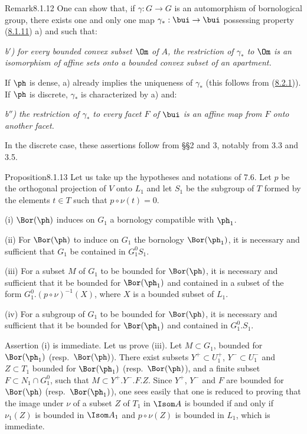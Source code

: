 \documentclass[12pt,a4paper,oneside,english]{smfart}
\makeatletter
\newcommand{\btanchor}[1]{\leavevmode\Hy@raisedlink{\hypertarget{bt:#1}{}}}
\newcommand{\btref}[1]{\hyperlink{bt:#1}{#1}}
\theoremstyle{definition}
\theoremstyle{bt}
\makeatother
\begin{document}
\begin{stmtup}{Remark}{8.1.12}\btanchor{8.1.12}
One can show that, if $\gamma:G\to G$ is an automorphism of bornological group, there
exists one and only one map $\gamma_*:\bui\to\bui$ possessing property (\btref{8.1.11}) a) and
such that:

\textit{b$'$)} \emph{for every bounded convex subset $\Om$ of $A$, the restriction of
$\gamma_*$ to $\Om$ is an isomorphism of affine sets onto a bounded convex subset of an
apartment.}

If $\ph$ is dense, a) already implies the uniqueness of $\gamma_*$ (this follows from
(\btref{8.2.1})). If $\ph$ is discrete, $\gamma_*$ is characterized by a) and:

\textit{b$''$)} \emph{the restriction of $\gamma_*$ to every facet $F$ of $\bui$ is an
affine map from $F$ onto another facet.}

In the discrete case, these assertions follow from \S\S2 and 3, notably from 3.3
and 3.5.
\end{stmtup}

\begin{stmt}{Proposition}{8.1.13}\btanchor{8.1.13}
Let us take up the hypotheses and notations of 7.6. Let $p$ be the orthogonal projection
of $V$ onto $L_1$ and let $S_1$ be the subgroup of $T$ formed by the elements $t\in T$
such that $p\circ\nu(t)=0$.

(i) $\Bor(\ph)$ induces on $G_1$ a bornology compatible with $\ph_1$.

(ii) For $\Bor(\ph)$ to induce on $G_1$ the bornology $\Bor(\ph_1)$, it is necessary and
sufficient that $G_1$ be contained in $G^0_1S_1$.

(iii) For a subset $M$ of $G_1$ to be bounded for $\Bor(\ph)$, it is necessary and
sufficient that it be bounded for $\Bor(\ph_1)$ and contained in a subset of the form
$G^0_1.(p\circ\nu)^{-1}(X)$, where $X$ is a bounded subset of $L_1$.

(iv) For a subgroup of $G_1$ to be bounded for $\Bor(\ph)$, it is necessary and
sufficient that it be bounded for $\Bor(\ph_1)$ and contained in $G^0_1.S_1$.
\end{stmt}

Assertion (i) is immediate. Let us prove (iii). Let $M\subset G_1$, bounded for
$\Bor(\ph_1)$ (resp.\ $\Bor(\ph)$). There exist subsets $Y^+\subset U^+_1$,
$Y^-\subset U^-_1$ and $Z\subset T_1$ bounded for $\Bor(\ph_1)$ (resp.\ $\Bor(\ph)$),
and a finite subset $F\subset N_1\cap G^0_1$, such that $M\subset Y^+.Y^-.F.Z$. Since
$Y^+$, $Y^-$ and $F$ are bounded for $\Bor(\ph)$ (resp.\ $\Bor(\ph_1)$), one sees
easily that one is reduced to proving that the image under $\nu$ of a subset $Z$ of
$T_1$ in $\Isom A$ is bounded if and only if $\nu_1(Z)$ is bounded in $\Isom A_1$ and
$p\circ\nu(Z)$ is bounded in $L_1$, which is immediate.
\end{document}
